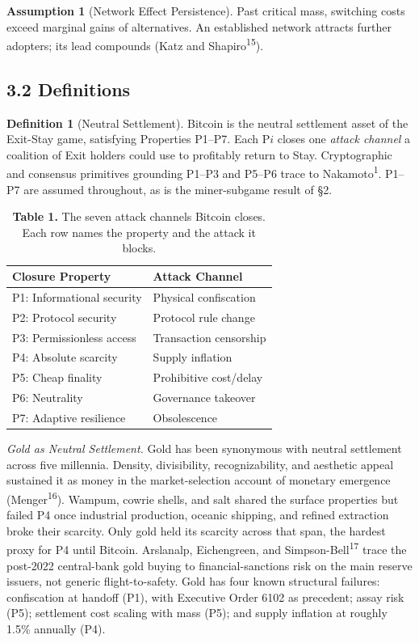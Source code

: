 \documentclass[12pt]{article}
\theoremstyle{definition}
\newtheorem{definition}{Definition}
\newtheorem{assumption}{Assumption}
\theoremstyle{remark}
\begin{document}
\begin{assumption}[Network Effect Persistence]
Past critical mass, switching costs exceed marginal gains of alternatives. An established network attracts further adopters; its lead compounds (Katz and Shapiro\textsuperscript{15}).
\end{assumption}

\subsection{3.2 Definitions}

\begin{definition}[Neutral Settlement]
Bitcoin is the neutral settlement asset of the Exit-Stay game, satisfying Properties P1--P7. Each P$i$ closes one \emph{attack channel} a coalition of Exit holders could use to profitably return to Stay. Cryptographic and consensus primitives grounding P1--P3 and P5--P6 trace to Nakamoto\textsuperscript{1}. P1--P7 are assumed throughout, as is the miner-subgame result of \S2.
\end{definition}



\begin{table}[h]
\centering
\caption*{\textbf{Table 1.} The seven attack channels Bitcoin closes. Each row names the property and the attack it blocks.}
\begin{tabular}{ll}
\toprule
Closure Property & Attack Channel \\
\midrule
P1: Informational security & Physical confiscation \\
P2: Protocol security & Protocol rule change \\
P3: Permissionless access & Transaction censorship \\
P4: Absolute scarcity & Supply inflation \\
P5: Cheap finality & Prohibitive cost/delay \\
P6: Neutrality & Governance takeover \\
P7: Adaptive resilience & Obsolescence \\
\bottomrule
\end{tabular}
\end{table}



\noindent\emph{Gold as Neutral Settlement.} Gold has been synonymous with neutral settlement across five millennia. Density, divisibility, recognizability, and aesthetic appeal sustained it as money in the market-selection account of monetary emergence (Menger\textsuperscript{16}). Wampum, cowrie shells, and salt shared the surface properties but failed P4 once industrial production, oceanic shipping, and refined extraction broke their scarcity. Only gold held its scarcity across that span, the hardest proxy for P4 until Bitcoin. Arslanalp, Eichengreen, and Simpson-Bell\textsuperscript{17} trace the post-2022 central-bank gold buying to financial-sanctions risk on the main reserve issuers, not generic flight-to-safety. Gold has four known structural failures: confiscation at handoff (P1), with Executive Order 6102 as precedent; assay risk (P5); settlement cost scaling with mass (P5); and supply inflation at roughly 1.5\% annually (P4).
\end{document}
